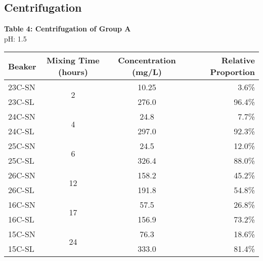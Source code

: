         \subsection{Centrifugation}
    \begin{center}
        \renewcommand\arraystretch{1.5}
        \vspace{2 mm}
        {\large{\bf Table 4: Centrifugation of Group A\\}}
        \vspace{2 mm}
        pH: 1.5\\
        \vspace{2 mm}
        \begin{tabular}{|l c c r|}
            \hline
            \textbf{Beaker} & \textbf{Mixing Time (hours)} & \textbf{Concentration (mg/L)} & \textbf{Relative Proportion} \\ \hline
            23C-SN & \multirow{2}{*}{2} & 10.25 & 3.6\% \\
            23C-SL & & 276.0 & 96.4\% \\\hline
            24C-SN & \multirow{2}{*}{4} & 24.8 & 7.7\% \\
            24C-SL & & 297.0 & 92.3\% \\\hline
            25C-SN & \multirow{2}{*}{6} & 24.5 & 12.0\% \\
            25C-SL & & 326.4 & 88.0\% \\\hline
            26C-SN & \multirow{2}{*}{12} & 158.2 & 45.2\% \\
            26C-SL & & 191.8 & 54.8\% \\\hline
            16C-SN & \multirow{2}{*}{17} & 57.5 & 26.8\% \\
            16C-SL & & 156.9 & 73.2\% \\\hline
            15C-SN & \multirow{2}{*}{24} & 76.3 & 18.6\% \\
            15C-SL & & 333.0 & 81.4\% \\ \hline
        \end{tabular}
    \end{center}
        \pgfplotsset{width=8.2cm, compat=1.9}
